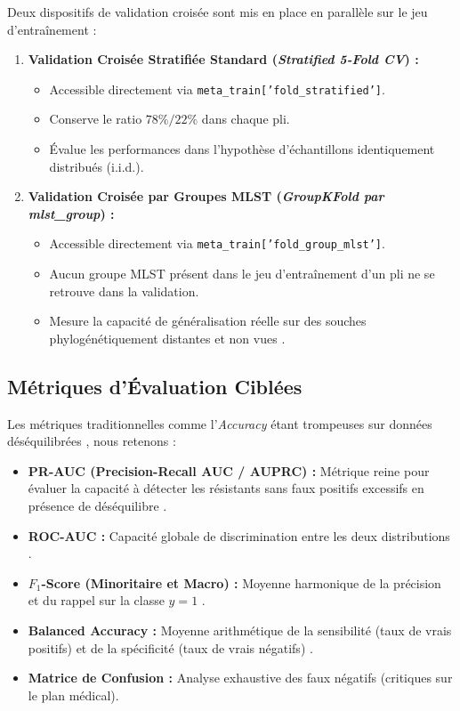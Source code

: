 \documentclass[11pt,a4paper]{article}
\begin{document}
Deux dispositifs de validation croisée sont mis en place en parallèle sur le jeu d'entraînement :
\begin{enumerate}
    \item \textbf{Validation Croisée Stratifiée Standard (\textit{Stratified 5-Fold CV}) \citep{hastie2009elements} :}
    \begin{itemize}
        \item Accessible directement via \texttt{meta\_train['fold\_stratified']}.
        \item Conserve le ratio $78\% / 22\%$ dans chaque pli.
        \item Évalue les performances dans l'hypothèse d'échantillons identiquement distribués (i.i.d.).
    \end{itemize}
    \item \textbf{Validation Croisée par Groupes MLST (\textit{GroupKFold par mlst\_group}) :}
    \begin{itemize}
        \item Accessible directement via \texttt{meta\_train['fold\_group\_mlst']}.
        \item Aucun groupe MLST présent dans le jeu d'entraînement d'un pli ne se retrouve dans la validation.
        \item Mesure la capacité de généralisation réelle sur des souches phylogénétiquement distantes et non vues \citep{moradigaravand2018prediction}.
    \end{itemize}
\end{enumerate}

\subsection{Métriques d'Évaluation Ciblées}

Les métriques traditionnelles comme l'\textit{Accuracy} étant trompeuses sur données déséquilibrées \citep{he2009learning}, nous retenons :
\begin{itemize}[leftmargin=*, label=$\bullet$]
    \item \textbf{PR-AUC (Precision-Recall AUC / AUPRC) :} Métrique reine pour évaluer la capacité à détecter les résistants sans faux positifs excessifs en présence de déséquilibre \citep{davis2006relationship,saito2015precision}.
    \item \textbf{ROC-AUC :} Capacité globale de discrimination entre les deux distributions \citep{fawcett2006introduction}.
    \item \textbf{$F_1$-Score (Minoritaire et Macro) :} Moyenne harmonique de la précision et du rappel sur la classe $y=1$ \citep{powers2011evaluation}.
    \item \textbf{Balanced Accuracy :} Moyenne arithmétique de la sensibilité (taux de vrais positifs) et de la spécificité (taux de vrais négatifs) \citep{brodersen2010balanced}.
    \item \textbf{Matrice de Confusion :} Analyse exhaustive des faux négatifs (critiques sur le plan médical).
\end{itemize}
\end{document}
